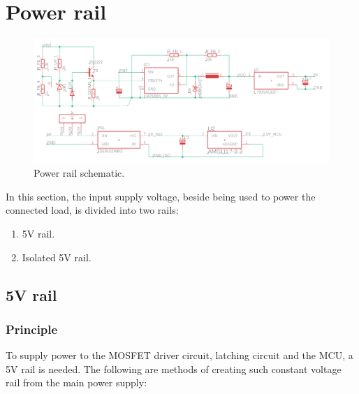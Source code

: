 \documentclass[../main.tex]{subfiles}
\begin{document}
    \section{Power rail}
    \justify
    \begin{figure}[!h]
        \centerline{\includegraphics[width=\linewidth]{media/power_rail_schematic.png}}
        \caption{Power rail schematic.}
        \label{fig:power_rail_schematic}
    \end{figure}
    In this section, the input supply voltage, beside being used to power the connected load, is divided into two rails:
    \begin{enumerate}
        \item 5V rail.
        \item Isolated 5V rail.
    \end{enumerate}
    
    \pagebreak
    \subsection{5V rail}

    \subsubsection{Principle}
    \justify
    To supply power to the MOSFET driver circuit, latching circuit and the MCU, a 5V rail is needed. The following are methods of creating such constant voltage rail from the main power supply:
\end{document}
